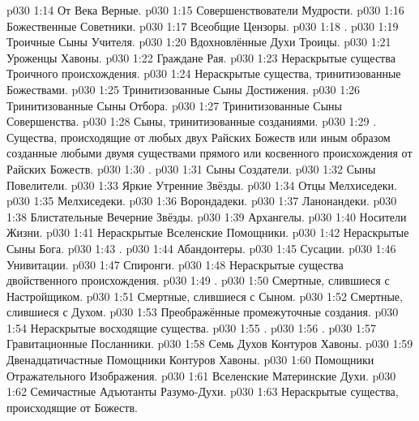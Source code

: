\vs p030 1:14 От Века Верные.
\vs p030 1:15 Совершенствователи Мудрости.
\vs p030 1:16 Божественные Советники.
\vs p030 1:17 Всеобщие Цензоры.
\vs p030 1:18 .
\vs p030 1:19 Троичные Сыны Учителя.
\vs p030 1:20 Вдохновлённые Духи Троицы.
\vs p030 1:21 Уроженцы Хавоны.
\vs p030 1:22 Граждане Рая.
\vs p030 1:23 Нераскрытые существа Троичного происхождения.
\vs p030 1:24 Нераскрытые существа, тринитизованные Божествами.
\vs p030 1:25 Тринитизованные Сыны Достижения.
\vs p030 1:26 Тринитизованные Сыны Отбора.
\vs p030 1:27 Тринитизованные Сыны Совершенства.
\vs p030 1:28 Сыны, тринитизованные созданиями.
\vs p030 1:29 . Существа, происходящие от любых двух Райских Божеств или иным образом созданные любыми двумя существами прямого или косвенного происхождения от Райских Божеств.
\vs p030 1:30 .
\vs p030 1:31 Сыны Создатели.
\vs p030 1:32 Сыны Повелители.
\vs p030 1:33 Яркие Утренние Звёзды.
\vs p030 1:34 Отцы Мелхиседеки.
\vs p030 1:35 Мелхиседеки.
\vs p030 1:36 Ворондадеки.
\vs p030 1:37 Ланонандеки.
\vs p030 1:38 Блистательные Вечерние Звёзды.
\vs p030 1:39 Архангелы.
\vs p030 1:40 Носители Жизни.
\vs p030 1:41 Нераскрытые Вселенские Помощники.
\vs p030 1:42 Нераскрытые Сыны Бога.
\vs p030 1:43 .
\vs p030 1:44 Абандонтеры.
\vs p030 1:45 Сусации.
\vs p030 1:46 Унивитации.
\vs p030 1:47 Спиронги.
\vs p030 1:48 Нераскрытые существа двойственного происхождения.
\vs p030 1:49 .
\vs p030 1:50 Смертные, слившиеся с Настройщиком.
\vs p030 1:51 Смертные, слившиеся с Сыном.
\vs p030 1:52 Смертные, слившиеся с Духом.
\vs p030 1:53 Преображённые промежуточные создания.
\vs p030 1:54 Нераскрытые восходящие существа.
\vs p030 1:55 .
\vs p030 1:56 .
\vs p030 1:57 Гравитационные Посланники.
\vs p030 1:58 Семь Духов Контуров Хавоны.
\vs p030 1:59 Двенадцатичастные Помощники Контуров Хавоны.
\vs p030 1:60 Помощники Отражательного Изображения.
\vs p030 1:61 Вселенские Материнские Духи.
\vs p030 1:62 Семичастные Адъютанты Разумо\hyp{}Духи.
\vs p030 1:63 Нераскрытые существа, происходящие от Божеств.
